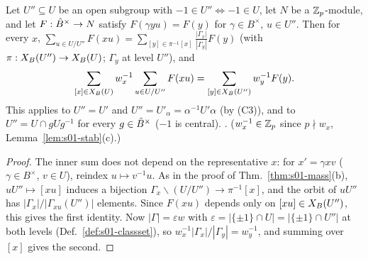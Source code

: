 \begin{lemma}[unfolding]\label{lem:s03-unfold}
Let $U''\subseteq U$ be an open subgroup with $-1\in U''\iff-1\in U$, let $N$ be a $\mathbb{Z}_p$-module, and let $F:\hat{B}^\times\to N$ satisfy $F(\gamma yu)=F(y)$
for $\gamma\in B^\times$, $u\in U''$. Then for every $x$, $\sum_{u\in U/U''}F(xu)=\sum_{[y]\in\pi^{-1}[x]}\frac{|\Gamma_x|}{|\Gamma_y|}F(y)$ (with
$\pi:X_B(U'')\to X_B(U)$; $\Gamma_y$ at level $U''$), and
\[\sum_{[x]\in X_B(U)}w_x^{-1}\sum_{u\in U/U''}F(xu)=\sum_{[y]\in X_B(U'')}w_y^{-1}F(y).\]
This applies to $U''=U'$ and $U''=U'_\alpha=\alpha^{-1}U'\alpha$ (by (C3)), and to $U''=U\cap gUg^{-1}$ for every $g\in\hat{B}^\times$ ($-1$ is central).
\stproved. ($w_x^{-1}\in\mathbb{Z}_p$ since $p\nmid w_x$, Lemma~\ref{lem:s01-stab}(c).)
\end{lemma}
\begin{proof}
The inner sum does not depend on the representative $x$: for $x'=\gamma xv$ ($\gamma\in B^\times$, $v\in U$), reindex $u\mapsto v^{-1}u$. As in the proof of
Thm.~\ref{thm:s01-mass}(b), $uU''\mapsto[xu]$ induces a bijection $\Gamma_x\backslash(U/U'')\to\pi^{-1}[x]$, and the orbit of $uU''$ has
$|\Gamma_x|/|\Gamma_{xu}(U'')|$ elements. Since $F(xu)$ depends only on $[xu]\in X_B(U'')$, this gives the first identity. Now $|\Gamma|=\varepsilon w$ with
$\varepsilon=|\{\pm1\}\cap U|=|\{\pm1\}\cap U''|$ at both levels (Def.~\ref{def:s01-classset}), so $w_x^{-1}|\Gamma_x|/|\Gamma_y|=w_y^{-1}$, and summing over $[x]$
gives the second.
\end{proof}

